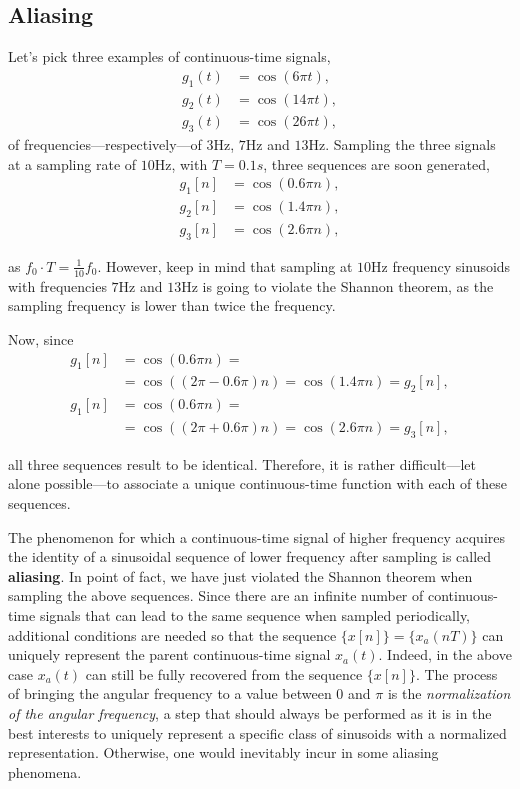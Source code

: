 \documentclass[\documentfontsize, twocolumn]{\classname}
\begin{document}
\subsection{Aliasing}

Let's pick three examples of con\-ti\-nuo\-us-time signals,
\begin{align*}
    g_1(t) &= \cos{(6\pi t)}, \\
    g_2(t) &= \cos{(14\pi t)}, \\
    g_3(t) &= \cos{(26\pi t)},
\end{align*}
of frequencies---respectively---of $3$Hz, $7$Hz and $13$Hz. Sampling the three signals at a sampling rate of $10$Hz, with $T=0.1s$, three se\-quen\-ces are soon generated,
\begin{align*}
    g_1[n] &= \cos{(0.6\pi n)}, \\
    g_2[n] &= \cos{(1.4\pi n)}, \\
    g_3[n] &= \cos{(2.6\pi n)},
\end{align*}

as $f_0 \cdot T = \frac{1}{10}f_0$. However, keep in mind that sampling at $10$Hz frequency sinusoids with frequencies $7$Hz and $13$Hz is going to violate the Shannon theorem, as the sampling frequency is lower than twice the frequency.

Now, since
\begin{align*}
    g_1[n] &= \cos{(0.6\pi n)} =\\
           &= \cos{((2\pi - 0.6\pi)n)} = \cos{(1.4\pi n)} = g_2[n], \\
    g_1[n] &= \cos{(0.6\pi n)} =\\
           &= \cos{((2\pi + 0.6\pi)n)} = \cos{(2.6\pi n)} = g_3[n],
\end{align*}

all three se\-quen\-ces result to be identical. Therefore, it is rather difficult---let alone possible---to associate a unique con\-ti\-nuo\-us-time function with each of these se\-quen\-ces.

The phenomenon for which a con\-ti\-nuo\-us-time signal of high\-er frequency acquires the identity of a sinusoidal se\-quen\-ce of lower frequency after sampling is called \textbf{aliasing}. In point of fact, we have just violated the Shannon theorem when sampling the above sequences. Since there are an infinite number of con\-ti\-nuo\-us-time signals that can lead to the same se\-quen\-ce when sampled periodically, additional conditions are needed so that the se\-quen\-ce $\{x[n]\} = \{x_a(nT)\}$ can uniquely represent the parent con\-ti\-nuo\-us-time signal $x_a(t)$. Indeed, in the above case $x_a(t)$ can still be fully recovered from the se\-quen\-ce $\{x[n]\}$. The process of bringing the angular frequency to a value between $0$ and $\pi$ is the \emph{normalization of the angular frequency}, a step that should always be performed as it is in the best interests to uniquely represent a specific class of sinusoids with a normalized representation.
Otherwise, one would inevitably incur in some aliasing phenomena.
\end{document}
